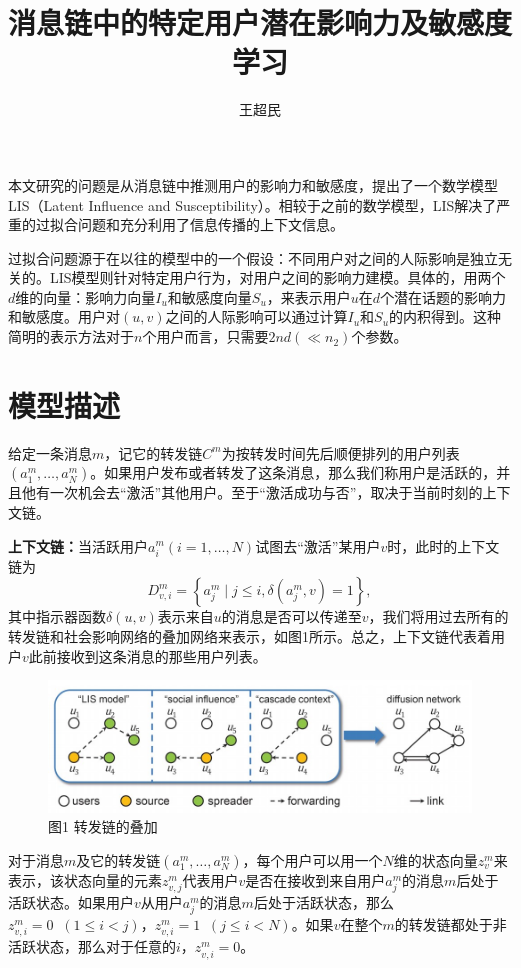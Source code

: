 \documentclass[UTF8]{ctexart}
\author{王超民}
\title{消息链中的特定用户潜在影响力及敏感度学习}
\begin{document}
\maketitle
\par 本文研究的问题是从消息链中推测用户的影响力和敏感度，提出了一个数学模型LIS（Latent Influence and Susceptibility）。相较于之前的数学模型，LIS解决了严重的过拟合问题和充分利用了信息传播的上下文信息。
\par 过拟合问题源于在以往的模型中的一个假设：不同用户对之间的人际影响是独立无关的。LIS模型则针对特定用户行为，对用户之间的影响力建模。具体的，用两个$d$维的向量：影响力向量$I_{u}$和敏感度向量$S_{u}$，来表示用户$u$在$d$个潜在话题的影响力和敏感度。用户对$(u,v)$之间的人际影响可以通过计算$I_{u}$和$S_{u}$的内积得到。这种简明的表示方法对于$n$个用户而言，只需要$2nd(\ll n_{2})$个参数。
\section*{模型描述}
\par 给定一条消息$m$，记它的转发链$C^{m}$为按转发时间先后顺便排列的用户列表$(a_{1}^{m},\dots,a_{N}^{m})$。如果用户发布或者转发了这条消息，那么我们称用户是活跃的，并且他有一次机会去“激活”其他用户。至于“激活成功与否”，取决于当前时刻的上下文链。
\par \noindent \textbf{上下文链：}当活跃用户$a_{i}^{m}(i=1,\dots,N)$试图去“激活”某用户$v$时，此时的上下文链为
\begin{equation}
D_{v,i}^{m}=\left \{ a_{j}^{m} \mid j\leq i,\delta (a_{j}^{m},v)=1  \right \},
\end{equation}
其中指示器函数$\delta (u,v)$表示来自$u$的消息是否可以传递至$v$，我们将用过去所有的转发链和社会影响网络的叠加网络来表示，如图1所示。总之，上下文链代表着用户$v$此前接收到这条消息的那些用户列表。
\begin{figure}[h!]
    \centering
    \includegraphics[width=12cm]{Fig1.jpg}
    \caption{图1 转发链的叠加}
    \label{fig-sample}
\end{figure}
\par 对于消息$m$及它的转发链$(a_{1}^{m},\dots,a_{N}^{m})$，每个用户可以用一个$N$维的状态向量$z_{v}^{m}$来表示，该状态向量的元素$z_{v,j}^{m}$代表用户$v$是否在接收到来自用户$a_{j}^{m}$的消息$m$后处于活跃状态。如果用户$v$从用户$a_{j}^{m}$的消息$m$后处于活跃状态，那么$z_{v,i}^{m}=0\;\;  (1\leq i< j)$，$z_{v,i}^{m}=1\;\;  (j\leq i< N)$。如果$v$在整个$m$的转发链都处于非活跃状态，那么对于任意的$i$，$z_{v,i}^{m}=0$。
\end{document}

